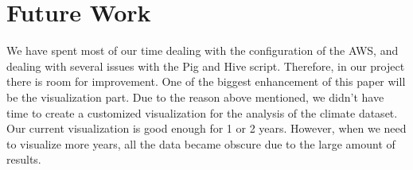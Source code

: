 

\section{Future Work}
\label{sec:futureWork}
 We have spent most of our time dealing with the configuration of the AWS, and dealing with several issues with
the Pig and Hive script. Therefore, in our project there is room for improvement. One of the biggest enhancement of this paper will be the visualization part. Due to the reason above mentioned, we didn’t have time to create a customized visualization for the analysis of the climate dataset. Our current visualization is good enough for 1 or 2 years. However, when we need to visualize more years, all the data became obscure due to the large amount of results.

